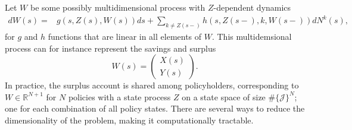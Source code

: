 \documentclass[12pt]{article}
\newcommand{\R}{\mathbb{R}}
\begin{document}
Let $W$ be some possibly multidimensional process with $Z$-dependent dynamics
\begin{align*}
dW(s)=& g(s,Z(s),W(s)) ds+ \sum_{k\neq Z(s-)} h(s,Z(s-),k,W(s-)) dN^k(s),
\end{align*}
for $g$ and $h$ functions that are linear in all elements of $W$. This multidemsional process can for instance represent the savings and surplus
$$
W(s)= \begin{pmatrix}
X(s)\\
Y(s)
\end{pmatrix}.
$$
In practice, the surplus account is shared among policyholders, corresponding to $W\in \R^{N+1}$ for $N$ policies with a state process $Z$ on a state space of size $\# \{ \mathcal{J} \}^N$; one for each combination of all policy states. There are several ways to reduce the dimensionality of the problem, making it computationally tractable.
\end{document}
